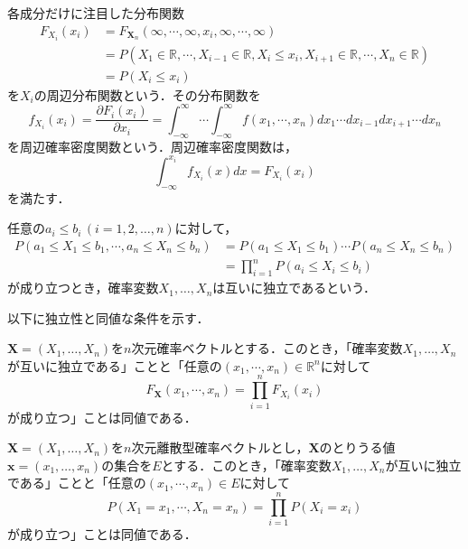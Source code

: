 \documentclass{jsreport}
\begin{document}
各成分だけに注目した分布関数
\begin{align}
  F_{X_i}(x_i) &= F_{\bm{X}_n}(\infty, \cdots, \infty, x_i, \infty, \cdots, \infty) \nonumber \\
   &= P(X_1 \in \mathbb{R}, \cdots, X_{i - 1} \in \mathbb{R}, X_i \leq x_i, X_{i + 1} \in \mathbb{R}, \cdots, X_n \in \mathbb{R}) \nonumber \\
   &= P(X_i \leq x_i) \nonumber
\end{align}
を$X_i$の周辺分布関数という．その分布関数を
\begin{equation}
  f_{X_i}(x_i) = \frac{\partial F_i(x_i)}{\partial x_i} = \int_{-\infty}^{\infty} \cdots \int_{-\infty}^{\infty} f(x_1, \cdots, x_n) dx_1 \cdots dx_{i - 1} dx_{i + 1} \cdots dx_n \nonumber
\end{equation}
を周辺確率密度関数という．周辺確率密度関数は，
\begin{equation}
  \int_{-\infty}^{x_i} f_{X_i}(x) dx = F_{X_i}(x_i) \nonumber
\end{equation}
を満たす．

\begin{screen}
  \begin{defi}[確率変数の独立]
    任意の$a_i \leq b_i \, (i = 1, 2, \ldots, n)$に対して，
    \begin{align}
      P(a_1 \leq X_1 \leq b_1, \cdots, a_n \leq X_n \leq b_n) &= P(a_1 \leq X_1 \leq b_1) \cdots P(a_n \leq X_n \leq b_n) \nonumber \\
      &= \prod_{i = 1}^n P(a_i \leq X_i \leq b_i) \nonumber
    \end{align}
    が成り立つとき，確率変数$X_1, \ldots, X_n$は互いに独立であるという．
  \end{defi}
\end{screen}

以下に独立性と同値な条件を示す．

$\bm{X} = (X_1, \ldots, X_n)$を$n$次元確率ベクトルとする．このとき，「確率変数$X_1, \ldots, X_n$が互いに独立である」ことと「任意の$(x_1, \cdots, x_n) \in \mathbb{R}^n$に対して
\begin{equation}
  F_{\bm{X}}(x_1, \cdots, x_n) = \prod_{i = 1}^n F_{X_i}(x_i) \nonumber
\end{equation}
が成り立つ」ことは同値である．

$\bm{X} = (X_1, \ldots, X_n)$を$n$次元離散型確率ベクトルとし，$\bm{X}$のとりうる値$\bm{x} = (x_1, \ldots, x_n)$の集合を$E$とする．このとき，「確率変数$X_1, \ldots, X_n$が互いに独立である」ことと「任意の$(x_1, \cdots, x_n) \in E$に対して
\begin{equation}
  P(X_1 = x_1, \cdots, X_n = x_n) = \prod_{i = 1}^n P(X_i = x_i) \nonumber
\end{equation}
が成り立つ」ことは同値である．
\end{document}
